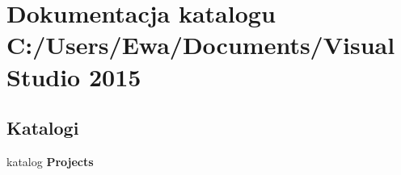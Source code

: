 \section{Dokumentacja katalogu C\+:/\+Users/\+Ewa/\+Documents/\+Visual Studio 2015}
\label{dir_2a901aacbd12b3574aeced34b7ee4546}
\subsection*{Katalogi}
\begin{DoxyCompactItemize}
\item 
katalog \textbf{ Projects}
\end{DoxyCompactItemize}
